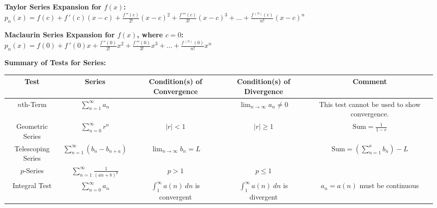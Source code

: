 \noindent\textbf{\large Taylor Series Expansion for $f(x)$:}\\[5pt]
\noindent$\displaystyle p_n(x) = f(c) + f\,'(c)(x-c) + \frac{f\,''(c)}{2!}(x-c)^2 + \frac{f\,'''(c)}{3!}(x-c)^3 + ... + \frac{f\,^{(n)}(c)}{n!}(x-c)^n
$
\baselineskip

\noindent\textbf{\large Maclaurin Series Expansion for $f(x)$, where $c=0$:}\\[5pt]
\noindent$\displaystyle p_n(x) = f(0) + f\,'(0)x + \frac{f\,''(0)}{2!}x^2 + \frac{f\,'''(0)}{3!}x^3 + ... + \frac{f\,^{(n)}(0)}{n!}x^n
$

\clearpage

\noindent\textbf{\large Summary of Tests for Series:}\\[5pt]

\noindent\begin{tabular}{|c|c|c|c|c|}
\hline
Test & Series & \rule[-15pt]{0pt}{33pt}\parbox{1in}{\centering Condition(s) of Convergence} & \parbox{1in}{\centering Condition(s) of Divergence} &   Comment \\ \hline
$n$th-Term & \rule[-15pt]{0pt}{33pt}$\displaystyle{\sum^\infty_{n=1}{a_n}}$ &  & $\displaystyle{\lim_{n \to \infty} a_n \neq 0}$ & \parbox{1.5in}{This test cannot be used to show convergence.}\\ \hline

Geometric Series & \rule[-15pt]{0pt}{33pt}$\displaystyle{\sum^\infty_{n=0}{r^n}}$ & $ \left| r \right| < 1$ & $\left| r \right| \geq 1$ &  $\displaystyle{\text{Sum} = \frac{1}{1-r}}$ \\ \hline

Telescoping Series &\rule[-15pt]{0pt}{33pt} $\displaystyle{\sum^\infty_{n=1}{(b_n-b_{n+a})}}$ & $\displaystyle{\lim_{n \to \infty} b_n = L}$ & & $\displaystyle\text{Sum}= \left(\sum^a_{n=1}b_n\right) -L$ \\ \hline

$p$-Series & \rule[-15pt]{0pt}{33pt}$\displaystyle{\sum^\infty_{n=1}{\frac{1}{(an+b)^p}}}$ & $p>1$ & $p\leq 1$ & \\ \hline

Integral Test & \rule[-20pt]{0pt}{40pt}$\displaystyle{\sum^\infty_{n=0}{a_n}}$ & \rule[-15pt]{0pt}{40pt}\parbox{1in}{\centering$\displaystyle \int_1^\infty a(n)\ dn$\\[3pt] is convergent} & \parbox{1in}{\centering$\displaystyle \int_1^\infty a(n)\ dn$\\[3pt] is divergent} & \parbox{1.2in}{$a_n = a(n)$ must be continuous}\\ \hline


\end{tabular}
